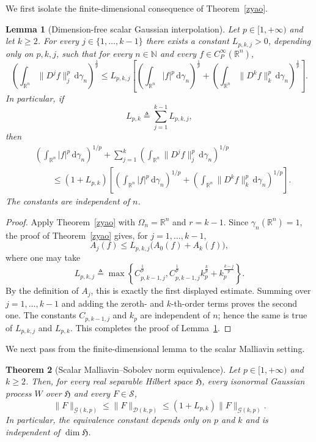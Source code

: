 \documentclass[12pt]{article}
\theoremstyle{plain}
\newtheorem{theorem}{Theorem}[section]
\newtheorem{lemma}[theorem]{Lemma}
\theoremstyle{definition}
\theoremstyle{remark}
\numberwithin{equation}{section}
\begin{document}
We first isolate the finite-dimensional consequence of Theorem~\ref{zyao}.

\begin{lemma}[Dimension-free scalar Gaussian interpolation]
	\label{lem:scalar-dimension-free-gaussian}
	Let $p\in[1,+\infty)$ and let $k\geqslant2$.  For every $j\in\{1,\ldots,k-1\}$ there exists a constant $L_{p,k,j}>0$, depending only on $p,k,j$, such that for every $n\in\mathbb{N}$ and every $f\in C_{P}^{\infty}(\mathbb{R}^{n})$,
	$$
	\left(\int_{\mathbb{R}^{n}}\|D^{j}f\|_{j}^{p}\,\mathrm{d}\gamma_{n}\right)^{\frac1p}
	\leqslant
	L_{p,k,j}
	\left[
	\left(\int_{\mathbb{R}^{n}}|f|^{p}\,\mathrm{d}\gamma_{n}\right)^{\frac1p}
	+
	\left(\int_{\mathbb{R}^{n}}\|D^{k}f\|_{k}^{p}\,\mathrm{d}\gamma_{n}\right)^{\frac1p}
	\right].
	$$
	In particular, if
	$$
	L_{p,k}\triangleq\sum_{j=1}^{k-1}L_{p,k,j},
	$$
	then
	\[
\begin{aligned}
&\left(\int_{\mathbb{R}^{n}}|f|^{p}\,\mathrm{d}\gamma_{n}\right)^{1/p}
+
\sum_{j=1}^{k}
\left(\int_{\mathbb{R}^{n}}\|D^{j}f\|_{j}^{p}\,\mathrm{d}\gamma_{n}\right)^{1/p}
\\
&\qquad\leqslant
(1+L_{p,k})
\left[
\left(\int_{\mathbb{R}^{n}}|f|^{p}\,\mathrm{d}\gamma_{n}\right)^{1/p}
+
\left(\int_{\mathbb{R}^{n}}\|D^{k}f\|_{k}^{p}\,\mathrm{d}\gamma_{n}\right)^{1/p}
\right].
\end{aligned}
\]
	The constants are independent of $n$.
\end{lemma}

\begin{proof}
	Apply Theorem~\ref{zyao} with $\Omega_{n}=\mathbb{R}^{n}$ and $r=k-1$.  Since $\gamma_{n}(\mathbb{R}^{n})=1$, the proof of Theorem~\ref{zyao} gives, for $j=1,\ldots,k-1$,
	$$
	A_{j}(f)
	\leqslant
	L_{p,k,j}\bigl(A_{0}(f)+A_{k}(f)\bigr),
	$$
	where one may take
	$$
	L_{p,k,j}
	\triangleq
	\max\left\{
	C_{p,k-1,j}^{\frac1p},
	C_{p,k-1,j}^{\frac1p}k_{p}^{\frac{k}{p}}
	+k_{p}^{\frac{k-j}{p}}
	\right\}.
	$$
	By the definition of $A_{j}$, this is exactly the first displayed estimate.  Summing over $j=1,\ldots,k-1$ and adding the zeroth- and $k$-th-order terms proves the second one.  The constants $C_{p,k-1,j}$ and $k_p$ are independent of $n$; hence the same is true of $L_{p,k,j}$ and $L_{p,k}$.  This completes the proof of Lemma~\ref{lem:scalar-dimension-free-gaussian}.
\end{proof}

We next pass from the finite-dimensional lemma to the scalar Malliavin setting.

\begin{theorem}[Scalar Malliavin--Sobolev norm equivalence]
	\label{thm:scalar-malliavin-equivalence-all-p-k}
	Let $p\in[1,+\infty)$ and $k\geqslant2$.  Then, for every real separable Hilbert space $\mathfrak{H}$, every isonormal Gaussian process $W$ over $\mathfrak{H}$ and every $F\in\mathcal{S}$,
	$$
	\|F\|_{\mathcal{G}(k,p)}
	\leqslant
	\|F\|_{\mathcal{D}(k,p)}
	\leqslant
	(1+L_{p,k})\|F\|_{\mathcal{G}(k,p)}.
	$$
	In particular, the equivalence constant depends only on $p$ and $k$ and is independent of $\dim\mathfrak{H}$.
\end{theorem}
\end{document}
